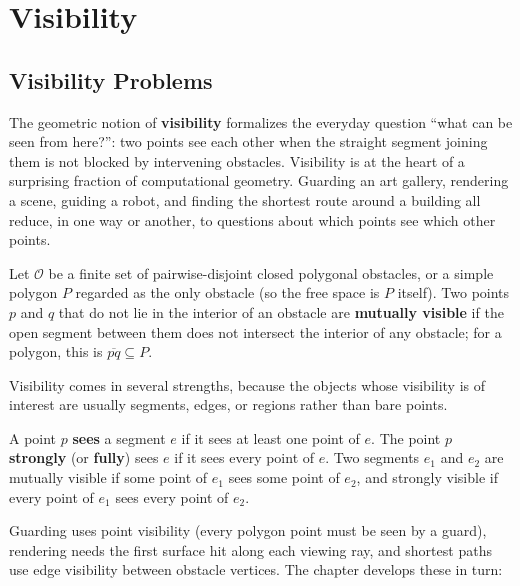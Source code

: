 \chapter{Visibility}
\label{ch:visibility}

\section{Visibility Problems}
\label{sec:visibility_problems}

The geometric notion of \textbf{visibility} formalizes the
everyday question ``what can be seen from here?'': two points see each other
when the straight segment joining them is not blocked by intervening
obstacles. Visibility is at the heart of a surprising fraction of
computational geometry. Guarding an art gallery, rendering a scene, guiding
a robot, and finding the shortest route around a building all reduce, in
one way or another, to questions about which points see which other points.

\begin{definition}\label{def:vis_mutual}
  Let $\mathcal{O}$ be a finite set of pairwise-disjoint closed polygonal
  obstacles, or a simple polygon $P$ regarded as the only obstacle (so the
  free space is $P$ itself). Two points $p$ and $q$ that do not lie in the
  interior of an obstacle are \textbf{mutually visible} if the open segment
  between them does not intersect the interior of any obstacle; for a
  polygon, this is $\overline{pq} \subseteq P$.
\end{definition}

Visibility comes in several strengths, because the objects whose visibility
is of interest are usually segments, edges, or regions rather than bare
points.

\begin{definition}\label{def:vis_edge}
  A point $p$ \textbf{sees} a segment $e$ if it sees at least one point of
  $e$. The point $p$ \textbf{strongly} (or \textbf{fully}) sees $e$ if it
  sees every point of $e$. Two segments $e_1$ and $e_2$ are mutually visible
  if some point of $e_1$ sees some point of $e_2$, and strongly visible if
  every point of $e_1$ sees every point of $e_2$.
\end{definition}

Guarding uses point visibility (every polygon point must be seen by a
guard), rendering needs the first surface hit along each viewing ray, and
shortest paths use edge visibility between obstacle vertices. The chapter
develops these in turn:

